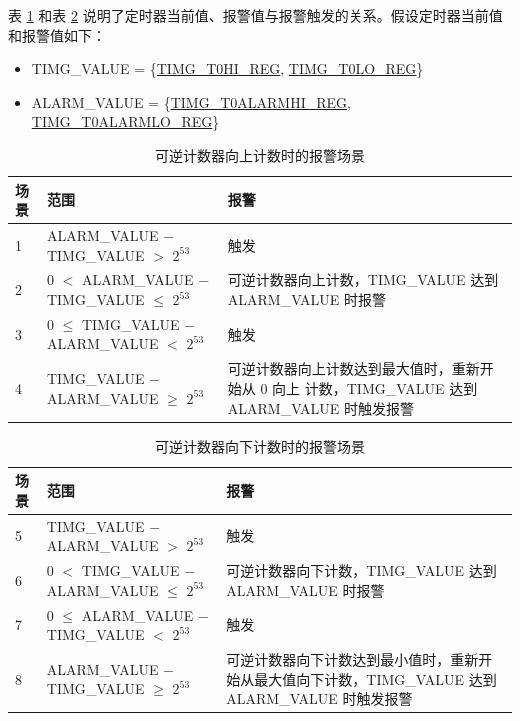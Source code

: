 \documentclass[main\_\_CN.tex]{subfiles}
\begin{document}
表 \ref{tab:timg-alarm-generation-up} 和表 \ref{tab:timg-alarm-generation-down} 说明了定时器当前值、报警值与报警触发的关系。假设定时器当前值和报警值如下：

\begin{itemize}
    \item TIMG\_VALUE = \{\hyperref[regdesc:TIMGTXHIREG]{TIMG\_T0HI\_REG}, \hyperref[regdesc:TIMGTXLOREG]{TIMG\_T0LO\_REG}\}
    \item ALARM\_VALUE = \{\hyperref[regdesc:TIMGTXALARMHIREG]{TIMG\_T0ALARMHI\_REG}, \hyperref[regdesc:TIMGTXALARMLOREG]{TIMG\_T0ALARMLO\_REG}\}
\end{itemize}

\begin{table}[H]
\centering
\caption{可逆计数器向上计数时的报警场景}
\label{tab:timg-alarm-generation-up}

\begin{tabular}{|l|l|m{7cm}|}
\hline
\rowcolor{lightgray}
    \textbf{场景} & \textbf{范围} & \textbf{报警} \\\hline
     1 & ALARM\_VALUE $-$ TIMG\_VALUE $>$ $2^{53}$ & 触发 \\\hline
     2 & 0 $<$ ALARM\_VALUE $-$ TIMG\_VALUE $\leq$ $2^{53}$ & 可逆计数器向上计数，TIMG\_VALUE 达到 ALARM\_VALUE 时报警 \\\hline
     3 & 0 $\leq$ TIMG\_VALUE $-$ ALARM\_VALUE $<$ $2^{53}$ & 触发 \\\hline
     4 & TIMG\_VALUE $-$ ALARM\_VALUE $\geq$ $2^{53}$ & 可逆计数器向上计数达到最大值时，重新开始从 0 向上 计数，TIMG\_VALUE 达到 ALARM\_VALUE 时触发报警\\\hline
\end{tabular}
\end{table}

\begin{table}[H]
\centering
\caption{可逆计数器向下计数时的报警场景}
\label{tab:timg-alarm-generation-down}

\begin{tabular}{|l|l|m{7cm}|}
\hline
\rowcolor{lightgray}
    \textbf{场景} & \textbf{范围} & \textbf{报警} \\\hline
     5 & TIMG\_VALUE $-$ ALARM\_VALUE  $>$ $2^{53}$ & 触发 \\\hline
     6 &  0 $<$ TIMG\_VALUE $-$ ALARM\_VALUE $\leq$ $2^{53}$ & 可逆计数器向下计数，TIMG\_VALUE 达到 ALARM\_VALUE 时报警 \\\hline
     7 & 0 $\leq$ ALARM\_VALUE $-$ TIMG\_VALUE $<$ $2^{53}$ & 触发 \\\hline
     8 & ALARM\_VALUE $-$ TIMG\_VALUE $\geq$ $2^{53}$ & 可逆计数器向下计数达到最小值时，重新开始从最大值向下计数，TIMG\_VALUE 达到 ALARM\_VALUE 时触发报警 \\\hline
\end{tabular}
\end{table}
\end{document}
